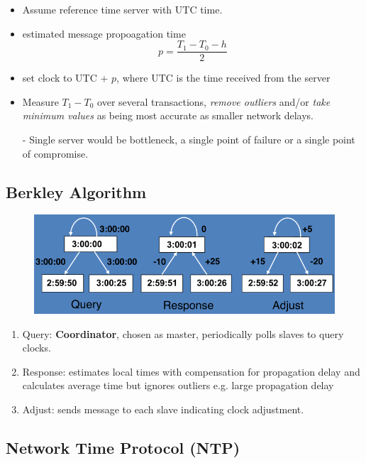 \documentclass[twocolumn,landscape,10pt]{article}
\theoremstyle{definition}
\begin{document}
\begin{itemize}
    \item Assume reference time server with UTC time.
    \item estimated message propoagation time 
        \[
            p=\frac{T_1-T_0-h}{2}
        \]
    \item set clock to UTC + $p$, where UTC is the time received from the
        server
    \item Measure $T_1-T_0$ over several transactions, \emph{remove outliers}
        and/or \emph{take minimum values} as being most accurate as smaller
        network delays.
    \item[-] Single server would be bottleneck, a single point of failure or a
        single point of compromise.
\end{itemize} 

\subsection{Berkley Algorithm}

\begin{figure}[h]
  	\includegraphics[scale=0.35]{berkley.png}
  	\centering
\end{figure}

\begin{enumerate}
    \item Query: \textbf{Coordinator}, chosen as master, periodically polls slaves to
        query clocks.
    \item Response: estimates local times with compensation for propagation
        delay and calculates average time but ignores outliers e.g. large
        propagation delay
    \item Adjust: sends message to each slave indicating clock adjustment.
\end{enumerate} 

\subsection{Network Time Protocol (NTP)}
\end{document}
